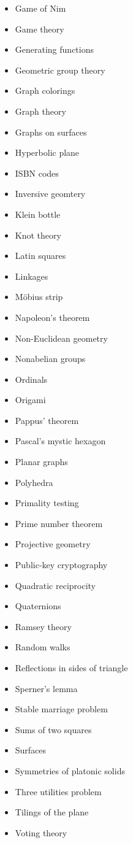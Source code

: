 \documentclass[12pt]{handout}
\begin{document}
\begin{multicols}{3}
\begin{itemize}
  \item Game of Nim
  \item Game theory
  \item Generating functions
  \item Geometric group theory
  \item Graph colorings
  \item Graph theory
  \item Graphs on surfaces
  \item Hyperbolic plane
  \item ISBN codes
  \item Inversive geomtery
  \item Klein bottle 
  \item Knot theory
  \item Latin squares
  \item Linkages
  \item M\"obius strip
  \item Napoleon's theorem
  \item Non-Euclidean geometry
  \item Nonabelian groups
  \item Ordinals
  \item Origami
  \item Pappus' theorem
  \item Pascal's mystic hexagon
  \item Planar graphs
  \item Polyhedra
  \item Primality testing
  \item Prime number theorem
  \item Projective geometry
  \item Public-key cryptography
  \item Quadratic reciprocity
  \item Quaternions
  \item Ramsey theory
  \item Random walks
  \item Reflections in sides of triangle
  \item Sperner's lemma
  \item Stable marriage problem
  \item Sums of two squares
  \item Surfaces
  \item Symmetries of platonic solids
  \item Three utilities problem
  \item Tilings of the plane
  \item Voting theory
  \end{itemize}
\end{multicols}
\end{document}
